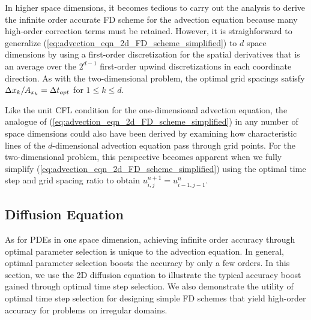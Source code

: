 \documentclass[oneeqnum,onefignum,onetabnum,onethmnum]{siamltex}
\begin{document}
In higher space dimensions, it becomes tedious to carry out the analysis 
to derive the infinite order accurate FD scheme for the advection equation
because many high-order correction terms must be retained.  However, it is 
straighforward to generalize 
(\ref{eq:advection_eqn_2d_FD_scheme_simplified}) to $d$ space dimensions by 
using a first-order discretization for the spatial derivatives that is an 
average over the $2^{d-1}$ first-order upwind discretizations in each 
coordinate direction.   As with the two-dimensional problem, the optimal 
grid spacings satisfy $\Delta x_k/A_{x_k} = \Delta t_{opt}$ for $1 \le k \le d$.

Like the unit CFL condition for the one-dimensional advection equation, the 
analogue of (\ref{eq:advection_eqn_2d_FD_scheme_simplified}) in any number
of space dimensions could also have been derived by examining how 
characteristic lines of the $d$-dimensional advection equation pass 
through grid points.  For the two-dimensional problem, this perspective 
becomes apparent when we fully simplify 
(\ref{eq:advection_eqn_2d_FD_scheme_simplified}) using the 
optimal time step and grid spacing ratio to obtain
$u^{n+1}_{i,j} = u^{n}_{i-1,j-1}$.



\subsection{Diffusion Equation}
As for PDEs in one space dimension, achieving infinite order accuracy 
through optimal parameter selection is unique to the advection equation.
In general, optimal parameter selection boosts the accuracy by only a few 
orders.  In this section, we use the 2D diffusion equation to illustrate the 
typical accuracy boost gained through optimal time step selection.  We also 
demonstrate the utility of optimal time step selection for designing simple 
FD schemes that yield high-order accuracy for problems on irregular domains.
\end{document}
